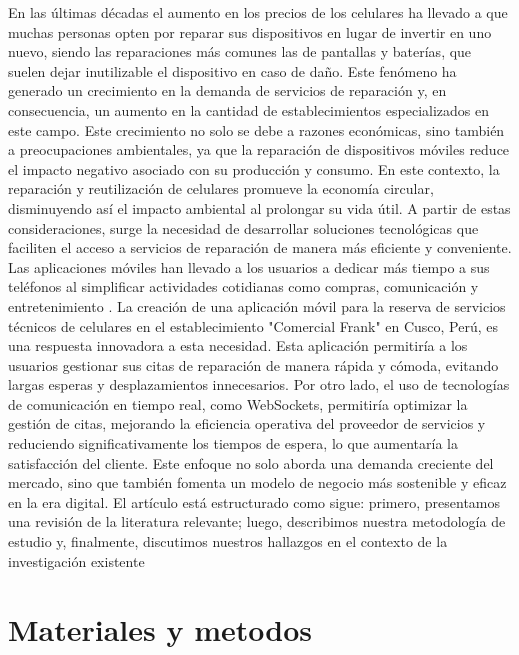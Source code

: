 \documentclass[]{article}
\begin{document}
En las últimas décadas el aumento en los precios de los celulares ha llevado a que muchas personas opten por reparar sus dispositivos en lugar de invertir en uno nuevo, siendo las reparaciones más comunes las de pantallas y baterías, que suelen dejar inutilizable el dispositivo en caso de daño\cite{Weter6deNoviembrede2020}. Este fenómeno ha generado un crecimiento en la demanda de servicios de reparación y, en consecuencia, un aumento en la cantidad de establecimientos especializados en este campo. Este crecimiento no solo se debe a razones económicas, sino también a preocupaciones ambientales, ya que la reparación de dispositivos móviles reduce el impacto negativo asociado con su producción y consumo. En este contexto, la reparación y reutilización de celulares promueve la economía circular, disminuyendo así el impacto ambiental al prolongar su vida útil. A partir de estas consideraciones, surge la necesidad de desarrollar soluciones tecnológicas que faciliten el acceso a servicios de reparación de manera más eficiente y conveniente. Las aplicaciones móviles han llevado a los usuarios a dedicar más tiempo a sus teléfonos al simplificar actividades cotidianas como compras, comunicación y entretenimiento \cite{bermudez2021importancia}. La creación de una aplicación móvil para la reserva de servicios técnicos de celulares en el establecimiento "Comercial Frank" en Cusco, Perú, es una respuesta innovadora a esta necesidad. Esta aplicación permitiría a los usuarios gestionar sus citas de reparación de manera rápida y cómoda, evitando largas esperas y desplazamientos innecesarios. Por otro lado, el uso de tecnologías de comunicación en tiempo real, como WebSockets, permitiría optimizar la gestión de citas, mejorando la eficiencia operativa del proveedor de servicios y reduciendo significativamente los tiempos de espera, lo que aumentaría la satisfacción del cliente. Este enfoque no solo aborda una demanda creciente del mercado, sino que también fomenta un modelo de negocio más sostenible y eficaz en la era digital\cite{Infobae2024}.
El artículo está estructurado como sigue: primero, presentamos una revisión de la literatura relevante; luego, describimos nuestra metodología de estudio y, finalmente, discutimos nuestros hallazgos en el contexto de la investigación existente

\section{Materiales y metodos}
\end{document}
